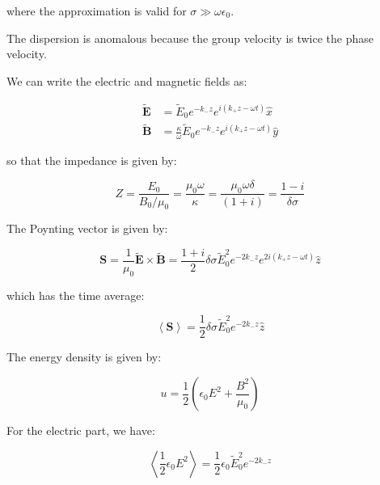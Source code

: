 \documentclass[12pt]{article}
\begin{document}
where the approximation is valid for $\sigma \gg \omega \epsilon_{0}$.

The dispersion is anomalous because the group velocity is twice the phase velocity.

We can write the electric and magnetic fields as:

\begin{equation}
\begin{split}
    \tilde{\mathbf{E}} &= \tilde{E}_{0} e^{-k_{-} z} e^{i(k_{+} z - \omega t)} \hat{x} \\
    \tilde{\mathbf{B}} &= \frac{\kappa}{\omega} \tilde{E}_{0} e^{-k_{-} z} e^{i(k_{+} z - \omega t)} \hat{y}
\end{split}
\end{equation}

so that the impedance is given by:

\begin{equation}
    Z = \frac{E_{0}}{B_{0}/\mu_{0}} = \frac{\mu_{0}\omega}{\kappa} = \frac{\mu_{0}\omega\delta}{(1 + i)} = \frac{1 - i}{\delta \sigma}
\end{equation}

The Poynting vector is given by:

\begin{equation}
    \mathbf{S} = \frac{1}{\mu_{0}} \tilde{\mathbf{E}} \times \tilde{\mathbf{B}} = \frac{1 + i}{2} \delta \sigma \tilde{E}_{0}^{2} e^{-2k_{-} z} e^{2i(k_{+} z - \omega t)} \hat{z}
\end{equation}

which has the time average:

\begin{equation}
    \left\langle \mathbf{S} \right\rangle = \frac{1}{2} \delta \sigma \tilde{E}_{0}^{2} e^{-2k_{-} z} \hat{z}
\end{equation}

The energy density is given by:

\begin{equation}
    u = \frac{1}{2} \left( \epsilon_{0} E^{2} + \frac{B^{2}}{\mu_{0}} \right)
\end{equation}

For the electric part, we have:

\begin{equation}
    \left\langle \frac{1}{2} \epsilon_{0} E^{2} \right\rangle = \frac{1}{2} \epsilon_{0} \tilde{E}_{0}^{2} e^{-2k_{-} z}
\end{equation}
\end{document}
